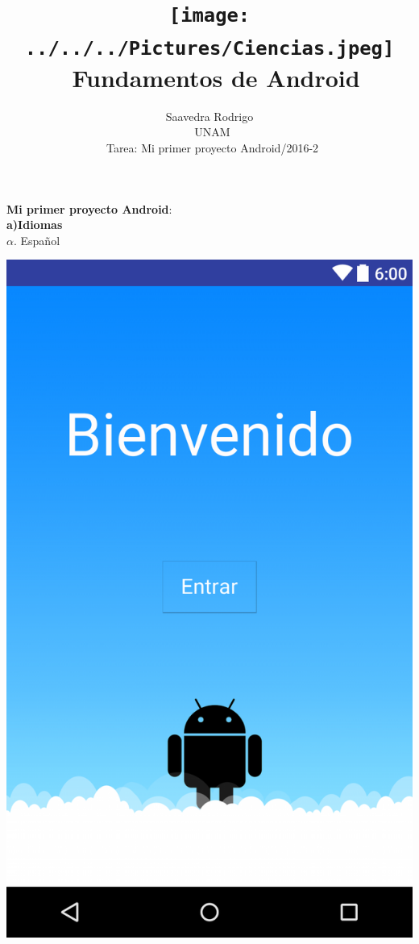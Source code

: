 \documentclass{article}
\title{\texttt{[image: ../../../Pictures/Ciencias.jpeg]}\\\
Fundamentos de Android}
\author{Saavedra Rodrigo\\\
UNAM\\\
Tarea: Mi primer proyecto Android/2016-2}
\begin{document}
\maketitle
\pagenumbering{roman}


\newpage

\noindent \textbf{Mi primer proyecto Android}:\\

\noindent \textbf{a)Idiomas}\\

$\alpha$. Espa\~{n}ol\

\begin{center}

\includegraphics[scale=.15]{layout-2016-04-17-esp_lay.png} 

\end{center}
\end{document}

